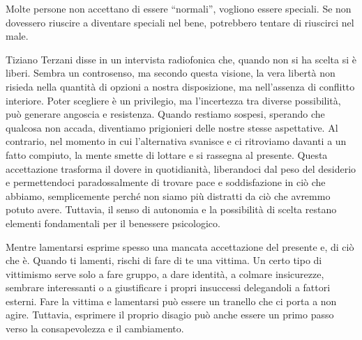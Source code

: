 \documentclass[12pt]{book} %
\begin{document}
Molte persone non accettano di essere “normali”, vogliono essere speciali. Se non dovessero riuscire a diventare speciali
nel bene, potrebbero tentare di riuscirci nel male. 

Tiziano Terzani disse in un intervista radiofonica che, quando non si ha scelta si è liberi. Sembra un controsenso, ma secondo questa visione, la vera libertà non risieda nella quantità di opzioni a nostra disposizione, ma nell'assenza di conflitto interiore. Poter scegliere è un privilegio, ma l'incertezza tra diverse possibilità, può generare angoscia e resistenza. Quando restiamo sospesi, sperando che qualcosa non accada, diventiamo prigionieri delle nostre stesse aspettative. Al contrario, nel momento in cui l'alternativa svanisce e ci ritroviamo davanti a un fatto compiuto, la mente smette di lottare e si rassegna al presente. Questa accettazione trasforma il dovere in quotidianità, liberandoci dal peso del desiderio e permettendoci paradossalmente di trovare pace e soddisfazione in ciò che abbiamo, semplicemente perché non siamo più distratti da ciò che avremmo potuto avere.
Tuttavia, il senso di autonomia e la possibilità di scelta restano elementi fondamentali per il benessere psicologico.

Mentre lamentarsi esprime spesso una mancata accettazione del presente e, di ciò che è. Quando ti lamenti, rischi di fare di te una vittima. Un certo tipo di vittimismo serve solo a fare gruppo, a dare identità, a colmare insicurezze, sembrare interessanti o a giustificare i propri insuccessi delegandoli a fattori esterni. Fare la vittima e lamentarsi può essere un tranello che ci porta a non agire. Tuttavia, esprimere il proprio disagio può anche essere un primo passo verso la consapevolezza e il cambiamento.
\end{document}
